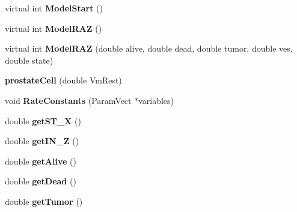 \begin{DoxyCompactItemize}
\item 
virtual int {\bfseries Model\+Start} ()\hypertarget{classprostateCell_ab1fa4778e87d8a367e19345111316393}{}\label{classprostateCell_ab1fa4778e87d8a367e19345111316393}

\item 
virtual int {\bfseries Model\+R\+AZ} ()\hypertarget{classprostateCell_ab63b999cb73f8cf29963aad67c71c701}{}\label{classprostateCell_ab63b999cb73f8cf29963aad67c71c701}

\item 
virtual int {\bfseries Model\+R\+AZ} (double alive, double dead, double tumor, double ves, double state)\hypertarget{classprostateCell_a6bf68a1c032238cbfa11648fd5e5ea26}{}\label{classprostateCell_a6bf68a1c032238cbfa11648fd5e5ea26}

\item 
{\bfseries prostate\+Cell} (double Vm\+Rest)\hypertarget{classprostateCell_a87b1118fde829ea09dabe64f2454ce8e}{}\label{classprostateCell_a87b1118fde829ea09dabe64f2454ce8e}

\item 
void {\bfseries Rate\+Constants} (Param\+Vect $\ast$variables)\hypertarget{classprostateCell_aa3ae31ce842637d4dbbd5df2b5129a66}{}\label{classprostateCell_aa3ae31ce842637d4dbbd5df2b5129a66}

\item 
double {\bfseries get\+S\+T\+\_\+X} ()\hypertarget{classprostateCell_a55eb5d6050695cc616e931717ed308ad}{}\label{classprostateCell_a55eb5d6050695cc616e931717ed308ad}

\item 
double {\bfseries get\+I\+N\+\_\+Z} ()\hypertarget{classprostateCell_a90b86ee3678ad69bdbfce31788c47a36}{}\label{classprostateCell_a90b86ee3678ad69bdbfce31788c47a36}

\item 
double {\bfseries get\+Alive} ()\hypertarget{classprostateCell_a216390b881cca3fae03564dc81305760}{}\label{classprostateCell_a216390b881cca3fae03564dc81305760}

\item 
double {\bfseries get\+Dead} ()\hypertarget{classprostateCell_a6e3db62b5c910232e4a0dc99665475c9}{}\label{classprostateCell_a6e3db62b5c910232e4a0dc99665475c9}

\item 
double {\bfseries get\+Tumor} ()\hypertarget{classprostateCell_ae8a5602659beaf963b7072303c35652f}{}\label{classprostateCell_ae8a5602659beaf963b7072303c35652f}


\end{DoxyCompactItemize}
